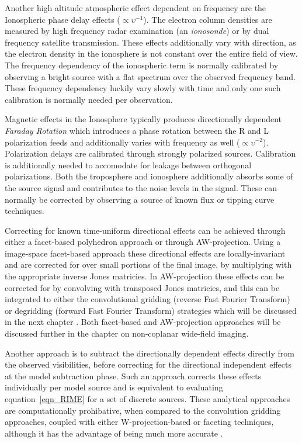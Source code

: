 \documentclass[a4paper,10pt]{report}
\begin{document}
 Another high altitude atmospheric effect dependent on frequency are the Ionospheric phase delay effects ($\propto \upsilon^{-1}$). The electron column densities are measured by high frequency radar examination (an \textit{ionosonde}) or by dual 
 frequency satellite transmission. These effects additionally vary with direction, as the electron density in the ionosphere is not constant over the entire field of view. The frequency dependency of the ionospheric term is 
 normally calibrated by observing a bright source with a flat spectrum over the observed frequency band. These frequency dependency luckily vary slowly with time and only one such calibration is normally needed per observation.

 Magnetic effects in the Ionosphere typically produces directionally dependent \textit{Faraday Rotation} which introduces a phase rotation between the R and L polarization feeds and additionally
 varies with frequency as well ($\propto \upsilon^{-2}$). Polarization delays are calibrated through strongly polarized sources. Calibration is additionally needed to accomodate for leakage between 
 orthogonal polarizations. Both the troposphere and ionosphere additionally absorbs some of the source signal and contributes to the noise levels in the signal. These can normally be corrected by 
 observing a source of known flux or tipping curve techniques.
 
 Correcting for known time-uniform directional effects can be achieved through either a facet-based polyhedron approach or through AW-projection. Using a image-space facet-based approach these directional
 effects are locally-invariant and are corrected for over small portions of the final image, by multiplying with the appropriate inverse Jones matricies. In AW-projection these effects can be corrected for by convolving with
 transposed Jones matricies, and this can be integrated to either the convolutional gridding (reverse Fast Fourier Transform) or degridding (forward Fast Fourier Transform) strategies which will be discussed 
 in the next chapter \cite{2011A&A...527A.107S}. Both facet-based and AW-projection approaches will be discussed further in the chapter on non-coplanar wide-field imaging.
 
 Another approach is to subtract the directionally dependent effects directly from the observed visibilities, before correcting for the directional independent effects at the model
 subtraction phase. Such an approach corrects these effects individually per model source and is equivalent to evaluating equation~\ref{eqn_RIME} for a set of discrete sources. These
 analytical approaches are computationally prohibative, when compared to the convolution gridding approaches, coupled with either W-projection-based or faceting techniques, although 
 it has the advantage of being much more accurate \cite{2011A&A...527A.107S}.
 
\end{document}
